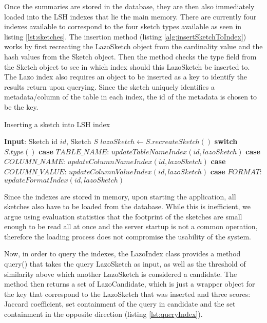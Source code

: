 Once the summaries are stored in the database, they are then also immediately loaded into the LSH indexes that lie the main memory. There are currently four indexes available to correspond to the 
four sketch types available as seen in listing \ref{lst:sketches}. The insertion method (listing \ref{alg:insertSketchToIndex}) works by first recreating the LazoSketch object from the cardinality value and the hash values from the Sketch object. Then the method checks the type field from the Sketch object to see in which index should this LazoSketch be inserted to. The Lazo index also requires an object to be inserted as a key to identify the results return upon querying. Since the sketch uniquely identifies a metadata/column of the table in each index, the id of the metadata is chosen to be the key.

\begin{algorithm}
    \caption{Inserting a sketch into LSH index}
    \label{alg:insertSketchToIndex}
    \begin{algorithmic}[1]
\STATE \textbf{Input}: Sketch id $id$, Sketch $S$
\STATE $lazoSketch \gets S.recreateSketch()$
\STATE \textbf{switch} $S.type()$
\STATE \: \textbf{case} $TABLE\_NAME$: $updateTableNameIndex(id, lazoSketch)$
\STATE \: \textbf{case} $COLUMN\_NAME$: $updateColumnNameIndex(id, lazoSketch)$
\STATE \: \textbf{case} $COLUMN\_VALUE$: $updateColumnValueIndex(id, lazoSketch)$
\STATE \: \textbf{case} $FORMAT$: $updateFormatIndex(id, lazoSketch)$
    \end{algorithmic}
\end{algorithm}

Since the indexes are stored in memory, upon starting the application, all sketches also have to be loaded from the database. While this is inefficient, we argue using evaluation statistics that the footprint of the sketches are small enough to be read all at once and the server startup is not a common operation, therefore the loading process does not compromise the usability of the system.

Now, in order to query the indexes, the LazoIndex class provides a method query() that takes the query LazoSketch as input, as well as the threshold of similarity above which another LazoSketch is considered a candidate. The method then returns a set of LazoCandidate, which is just a wrapper object for the key that correspond to the LazoSketch that was inserted and three scores: Jaccard coefficient, set containment of the query in candidate and the set containment in the opposite direction (listing \ref{lst:queryIndex}).

